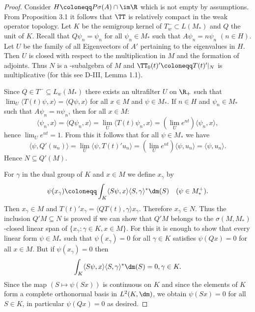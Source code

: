 \begin{proof}
Consider $H \coloneqq P\sigma(A) \cap \im\R$ which is not empty by assumptions.
From Proposition 3.1 it follows that $\TT$ is relatively compact in the weak operator topology.
Let $K$ be the semigroup kernel of $T^{-}_{w} \subset L(M_{*})$ and $Q$ the unit of $K$.
Recall that $Q\psi_{n} = \psi_{n}$ for all $\psi_{n} \in M_{*}$ such that $A\psi_{n} = n\psi_{n}$ $(n \in H)$.
Let $U$ be the family of all Eigenvectors of $A'$ pertaining to the eigenvalues in $H$.
Then $U$ is closed with respect to the multiplication in $M$ and the formation of adjoints.
Thus $N$ is a \WA-subalgebra of $M$ \citet[Corollary 1.7.9.]{sakai:1971} and $\TT_{0}(t)' \coloneqq T(t)'|_{N}$ is multiplicative (for this see D-III, Lemma 1.1).

Since $Q \in T^{-} \subseteq L_{w}(M_{*})$ there exists an ultrafilter $U$ on $\R_{+}$ such that $\lim_{U}\langle T(t)\psi,x\rangle = \langle Q\psi,x\rangle$ for all $x \in M$ and $\psi \in M_{*}$.
If $n \in H$ and $\psi_{n} \in M_{*}$ such that $A\psi_{n} = n\psi_{n}$, then for all $x \in M$:
\[
\langle\psi_{n},x\rangle = \langle Q\psi_{n},x\rangle = \lim_{U} \langle T(t)\psi_{n},x\rangle = (\lim_{U} e^{nt})\langle\psi_{n},x\rangle,
\]
hence $\lim_{U} e^{nt} = 1$.
From this it follows that for all $\psi \in M_{*}$ we have
\[
\langle\psi,Q'(u_{n})\rangle = \lim_{U} \langle\psi,T(t)'u_{n}\rangle = (\lim_{U} e^{nt})\langle\psi,u_{n}\rangle = \langle\psi,u_{n}\rangle.
\]
Hence $N \subseteq Q'(M)$.

For $\gamma$ in the dual group of $K$ and $x \in M$ we define $x_{\gamma}$ by
\[
\psi(x_{\gamma}) \coloneqq \int_{K} \langle S\psi,x\rangle\langle S,\gamma\rangle^{*} \dm (S) \quad (\psi \in M_{*}^{+}).
\]
Then $x_{\gamma} \in M$ and $T(t)'x_{\gamma} = \langle QT(t),\gamma\rangle x_{\gamma}$.
Therefore $x_{\gamma} \in N$.
Thus the inclusion $Q'M \subseteq N$ is proved if we can show that $Q'M$ belongs to the $\sigma(M,M_{*})$-closed linear span of $\{x_{\gamma} \colon \gamma \in K, x \in M\}$.
For this it is enough to show that every linear form $\psi \in M_{*}$ such that $\psi(x_{\gamma}) = 0$ for all $\gamma \in K$ satisfies $\psi(Qx) = 0$ for all $x \in M$.
But if $\psi(x_{\gamma}) = 0$ then
\[
\int_{K} \langle S\psi,x\rangle\langle S,\gamma\rangle^{*} \dm (S) = 0, \gamma \in K.
\]
Since the map $(S \mapsto \psi(Sx))$ is continuous on $K$ and since the elements of $K$ form a complete orthonormal basis in $L^2(K,\dm)$, we obtain $\psi(Sx) = 0$ for all $S \in K$, in particular $\psi(Qx) = 0$ as desired.


\end{proof}
